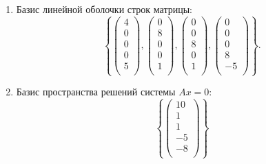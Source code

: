 \begin{enumerate}
	\item Базис линейной оболочки строк матрицы:
	      \[
		      \left\{
		      \begin{pmatrix}
			      4 \\ 0 \\ 0 \\ 0 \\ 5 \\
		      \end{pmatrix},
		      \begin{pmatrix}
			      0 \\ 8 \\ 0 \\ 0 \\ 1 \\
		      \end{pmatrix},
		      \begin{pmatrix}
			      0 \\ 0 \\ 8 \\ 0 \\ 1 \\
		      \end{pmatrix},
		      \begin{pmatrix}
			      0 \\ 0 \\ 0 \\ 8 \\ -5 \\
		      \end{pmatrix}
		      \right\}.
	      \]

	\item Базис пространства решений системы $Ax = 0$:
	      \[
		      \left\{
		      \begin{pmatrix}
			      10 \\ 1 \\ 1 \\ -5 \\ -8 \\
		      \end{pmatrix}
		      \right\}
	      \]
\end{enumerate}